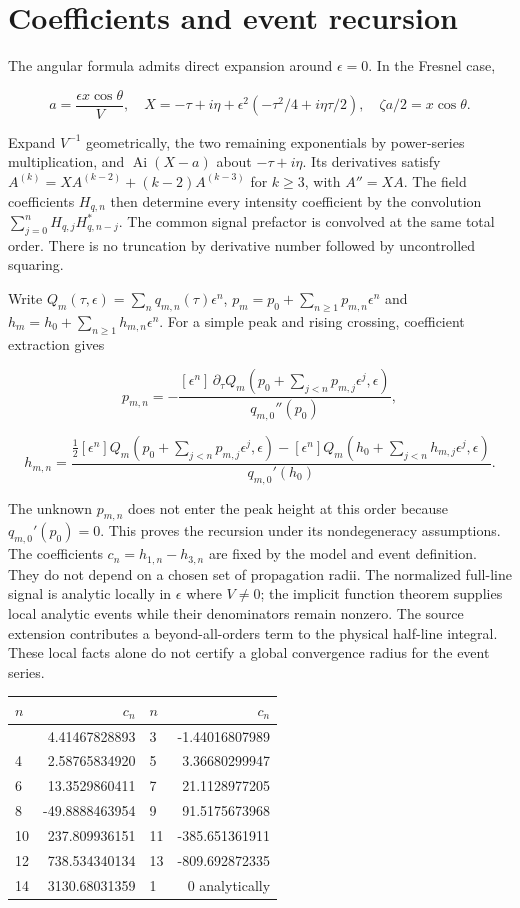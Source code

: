 \documentclass[11pt]{article}
\begin{document}
\section{Coefficients and event
recursion}\label{coefficients-and-event-recursion}

The angular formula admits direct expansion around \(\epsilon=0\). In
the Fresnel case,

\[a=\frac{\epsilon x\cos\theta}{V},\quad X=-\tau+i\eta+\epsilon^2(-\tau^2/4+i\eta\tau/2),\quad \zeta a/2=x\cos\theta.\]

Expand \(V^{-1}\) geometrically, the two remaining exponentials by
power-series multiplication, and \(\operatorname{Ai}(X-a)\) about
\(-\tau+i\eta\). Its derivatives satisfy
\(A^{(k)}=XA^{(k-2)}+(k-2)A^{(k-3)}\) for \(k\geq3\), with \(A''=XA\).
The field coefficients \(H_{q,n}\) then determine every intensity
coefficient by the convolution \(\sum_{j=0}^{n}H_{q,j}H_{q,n-j}^*\). The
common signal prefactor is convolved at the same total order. There is
no truncation by derivative number followed by uncontrolled squaring.

Write \(Q_m(\tau,\epsilon)=\sum_n q_{m,n}(\tau)\epsilon^n\),
\(p_m=p_0+\sum_{n\geq1}p_{m,n}\epsilon^n\) and
\(h_m=h_0+\sum_{n\geq1}h_{m,n}\epsilon^n\). For a simple peak and rising
crossing, coefficient extraction gives

\[p_{m,n}=-\frac{[\epsilon^n]\,\partial_\tau Q_m(p_0+\sum_{j<n}p_{m,j}\epsilon^j,\epsilon)}{q_{m,0}''(p_0)},\]

\[h_{m,n}=\frac{\tfrac12[\epsilon^n]Q_m(p_0+\sum_{j<n}p_{m,j}\epsilon^j,\epsilon)-[\epsilon^n]Q_m(h_0+\sum_{j<n}h_{m,j}\epsilon^j,\epsilon)}{q_{m,0}'(h_0)}.\]

The unknown \(p_{m,n}\) does not enter the peak height at this order
because \(q_{m,0}'(p_0)=0\). This proves the recursion under its
nondegeneracy assumptions. The coefficients \(c_n=h_{1,n}-h_{3,n}\) are
fixed by the model and event definition. They do not depend on a chosen
set of propagation radii. The normalized full-line signal is analytic
locally in \(\epsilon\) where \(V\neq0\); the implicit function theorem
supplies local analytic events while their denominators remain nonzero.
The source extension contributes a beyond-all-orders term to the
physical half-line integral. These local facts alone do not certify a
global convergence radius for the event series.

\begin{longtable}[]{@{}lrlr@{}}
\toprule\noalign{}
\(n\) & \(c_n\) & \(n\) & \(c_n\) \\
\midrule\noalign{}
\endhead
\bottomrule\noalign{}
\endlastfoot
2 & 4.41467828893 & 3 & -1.44016807989 \\
4 & 2.58765834920 & 5 & 3.36680299947 \\
6 & 13.3529860411 & 7 & 21.1128977205 \\
8 & -49.8888463954 & 9 & 91.5175673968 \\
10 & 237.809936151 & 11 & -385.651361911 \\
12 & 738.534340134 & 13 & -809.692872335 \\
14 & 3130.68031359 & 1 & 0 analytically \\
\end{longtable}
\end{document}
